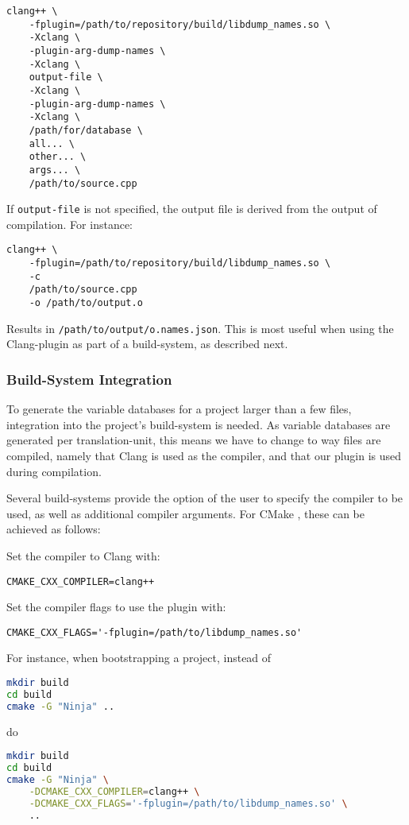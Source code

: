 \begin{lstlisting}[caption={Invocation of Clang}]
clang++ \
	-fplugin=/path/to/repository/build/libdump_names.so \
	-Xclang \
	-plugin-arg-dump-names \
	-Xclang \
	output-file \
	-Xclang \
	-plugin-arg-dump-names \
	-Xclang \
	/path/for/database \
	all... \
	other... \
	args... \
	/path/to/source.cpp
\end{lstlisting}

If \lstinline|output-file| is not specified, the output file is derived from the
output of compilation. For instance:

\begin{lstlisting}[caption={Invocation of Clang with Defaulted Output Filename}]
clang++ \
	-fplugin=/path/to/repository/build/libdump_names.so \
	-c
	/path/to/source.cpp
	-o /path/to/output.o
\end{lstlisting}

Results in \lstinline|/path/to/output/o.names.json|. This is most useful when
using the Clang-plugin as part of a build-system, as described next.

\subsubsection{Build-System Integration}
To generate the variable databases for a project larger than a few files,
integration into the project's build-system is needed. As variable databases are
generated per translation-unit, this means we have to change to way \CC{} files
are compiled, namely that Clang is used as the compiler, and that our plugin is
used during compilation.

Several build-systems provide the option of the user to specify the compiler to
be used, as well as additional compiler arguments. For CMake \cite{cmake}, these
can be achieved as follows:

Set the compiler to Clang with:
\begin{lstlisting}[caption={CMake Compiler Setting}]
CMAKE_CXX_COMPILER=clang++
\end{lstlisting}

Set the compiler flags to use the plugin with:
\begin{lstlisting}[caption={CMake Compiler Arguments}]
CMAKE_CXX_FLAGS='-fplugin=/path/to/libdump_names.so'
\end{lstlisting}

For instance, when bootstrapping a project, instead of
\begin{lstlisting}[caption={CMake Invocation without the Plugin}, language=bash]
mkdir build
cd build
cmake -G "Ninja" ..
\end{lstlisting}
do
\begin{lstlisting}[caption={CMake Invocation with the Plugin}, language=bash]
mkdir build
cd build
cmake -G "Ninja" \
	-DCMAKE_CXX_COMPILER=clang++ \
	-DCMAKE_CXX_FLAGS='-fplugin=/path/to/libdump_names.so' \
	..
\end{lstlisting}

